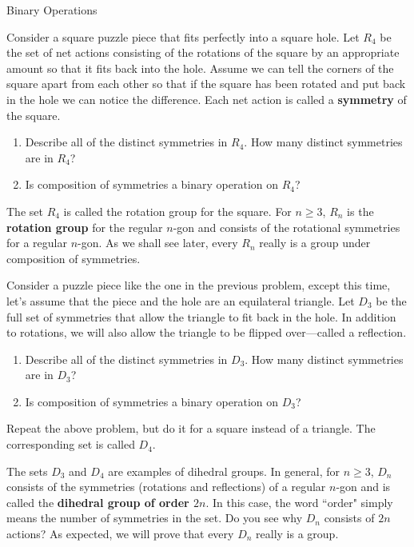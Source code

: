 \begin{section}{Binary Operations}
\begin{problem}\label{prob:introducing_R4}
Consider a square puzzle piece that fits perfectly into a square hole.  Let $R_4$ be the set of net actions consisting of the rotations of the square by an appropriate amount so that it fits back into the hole. Assume we can tell the corners of the square apart from each other so that if the square has been rotated and put back in the hole we can notice the difference. Each net action is called a \textbf{symmetry} of the square. 
\begin{enumerate}[label=\rm{(\alph*)}]
\item Describe all of the distinct symmetries in $R_4$. How many distinct symmetries are in $R_4$?
\item Is composition of symmetries a binary operation on $R_4$?
\end{enumerate}
\end{problem}

The set $R_4$ is called the rotation group for the square. For $n\geq 3$, $R_n$ is the \textbf{rotation group} for the regular $n$-gon and consists of the rotational symmetries for a regular $n$-gon. As we shall see later, every $R_n$ really is a group under composition of symmetries.

\begin{problem}\label{prob:introducing_D3}
Consider a puzzle piece like the one in the previous problem, except this time, let's assume that the piece and the hole are an equilateral triangle.  Let $D_3$ be the full set of symmetries that allow the triangle to fit back in the hole.  In addition to rotations, we will also allow the triangle to be flipped over---called a reflection. 
\begin{enumerate}[label=\rm{(\alph*)}]
\item Describe all of the distinct symmetries in $D_3$. How many distinct symmetries are in $D_3$?
\item Is composition of symmetries a binary operation on $D_3$?
\end{enumerate}
\end{problem}

\begin{problem}\label{prob:introducing_D4}
Repeat the above problem, but do it for a square instead of a triangle.  The corresponding set is called $D_4$.
\end{problem}

The sets $D_3$ and $D_4$ are examples of dihedral groups. In general, for $n\geq 3$, $D_n$ consists of the symmetries (rotations and reflections) of a regular $n$-gon and is called the \textbf{dihedral group of order $2n$}. In this case, the word ``order" simply means the number of symmetries in the set. Do you see why $D_n$ consists of $2n$ actions? As expected, we will prove that every $D_n$ really is a group.


\end{section}
